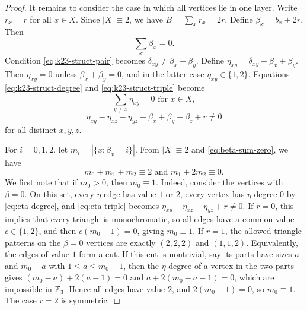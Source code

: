 ﻿\documentclass[11pt]{article}
\numberwithin{equation}{section}
\theoremstyle{remark}
\newcommand{\Z}{\mathbb Z}
\begin{document}
\begin{proof}
    It remains to consider the case in which all vertices lie in one layer.  Write $r_x=r$ for all $x\in X$.  Since $|X|\equiv2$, we have $B=\sum_xr_x=2r$.  Define $\beta_x=b_x+2r$.  Then
    \begin{equation}\label{eq:beta-sum-zero}
        \sum_x\beta_x=0.
    \end{equation}
    Condition \eqref{eq:k23-struct-pair} becomes $\delta_{xy}\ne\beta_x+\beta_y$.  Define $\eta_{xy}=\delta_{xy}+\beta_x+\beta_y$.  Then $\eta_{xy}=0$ unless $\beta_x+\beta_y=0$, and in the latter case $\eta_{xy}\in\{1,2\}$.  Equations \eqref{eq:k23-struct-degree} and \eqref{eq:k23-struct-triple} become
    \begin{equation}\label{eq:eta-degree}
        \sum_{y\ne x}\eta_{xy}=0\text{ for }x\in X,
    \end{equation}
    \begin{equation}\label{eq:eta-triple}
        \eta_{xy}-\eta_{xz}-\eta_{yz}+\beta_x+\beta_y+\beta_z+r\ne0
    \end{equation}
    for all distinct $x,y,z$.

    For \(i=0,1,2\), let $m_i=|\{x:\beta_x=i\}|$.  From $|X|\equiv2$ and \eqref{eq:beta-sum-zero}, we have
    \begin{equation}\label{eq:mi-basic}
        m_0+m_1+m_2\equiv2\text{ and }m_1+2m_2\equiv0.
    \end{equation}
    We first note that if \(m_0>0\), then
    \(m_0\equiv 1.\)
    Indeed, consider the vertices with \(\beta=0\). On this set, every \(\eta\)-edge has value \(1\) or \(2\), every vertex has \(\eta\)-degree \(0\) by \eqref{eq:eta-degree}, and \eqref{eq:eta-triple} becomes
    \(\eta_{xy}-\eta_{xz}-\eta_{yz}+r\ne 0.\)
    If \(r=0\), this implies that every triangle is monochromatic, so all edges have a common value \(c\in\{1,2\}\), and then \(c(m_0-1)=0\), giving \(m_0\equiv 1\). If \(r=1\), the allowed triangle patterns on the \(\beta=0\) vertices are exactly \((2,2,2)\) and \((1,1,2)\). Equivalently, the edges of value \(1\) form a cut. If this cut is nontrivial, say its parts have sizes $a$ and $m_0-a$ with $1\le a\le m_0-1$, then the \(\eta\)-degree of a vertex in the two parts gives $(m_0-a)+2(a-1)=0$ and $a+2(m_0-a-1)=0$, which are impossible in $\Z_3$. Hence all edges have value \(2\), and \(2(m_0-1)=0\), so \(m_0\equiv 1\). The case \(r=2\) is symmetric.


\end{proof}
\end{document}
